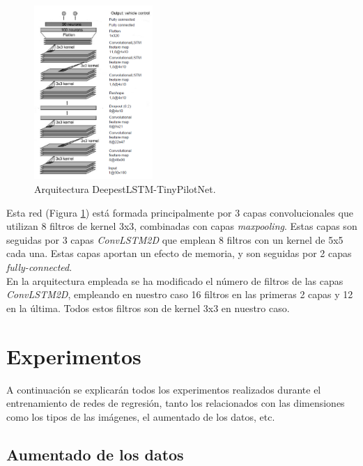 \begin{figure}
\begin{center}
	\includegraphics[width=0.4\textwidth]{figures/Regresion/deepestlstm_tinypilotnet.png}
   \caption{Arquitectura DeepestLSTM-TinyPilotNet.}
	\label{fig.DeepestLstm_TinyPilotNet}
\end{center}
\end{figure}

Esta red (Figura \ref{fig.DeepestLstm_TinyPilotNet}) está formada principalmente por 3 capas convolucionales que utilizan 8 filtros de kernel 3x3, combinadas con capas \textit{maxpooling}. Estas capas son seguidas por 3 capas \textit{ConvLSTM2D} que emplean 8 filtros con un kernel de 5x5 cada una. Estas capas aportan un efecto de memoria, y son seguidas por 2 capas \textit{fully-connected}.\\

En la arquitectura empleada se ha modificado el número de filtros de las capas \textit{ConvLSTM2D}, empleando en nuestro caso 16 filtros en las primeras 2 capas y 12 en la última. Todos estos filtros son de kernel 3x3 en nuestro caso.\\



\section{Experimentos}

A continuación se explicarán todos los experimentos realizados durante el entrenamiento de redes de regresión, tanto los relacionados con las dimensiones como los tipos de las imágenes, el aumentado de los datos, etc. \\

\subsection{Aumentado de los datos}


